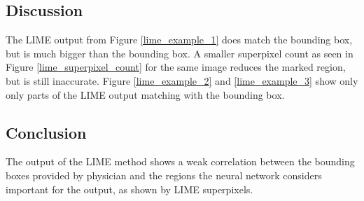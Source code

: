\subsection{Discussion}
The LIME output from Figure \ref{lime_example_1} does match the bounding box, but is much bigger than the bounding box. A smaller superpixel count as seen in Figure \ref{lime_superpixel_count} for the same image reduces the marked region, but is still inaccurate. Figure \ref{lime_example_2} and \ref{lime_example_3} show only only parts of the LIME output matching with the bounding box.

\subsection{Conclusion}
The output of the LIME method shows a weak correlation between the bounding boxes provided by physician and the regions the neural network considers important for the output, as shown by LIME superpixels.

